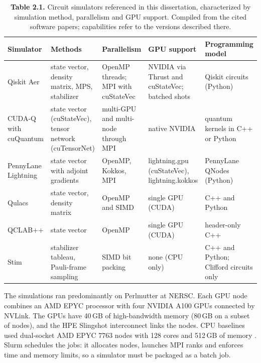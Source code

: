 \documentclass{report}
\theoremstyle{plain}
\theoremstyle{definition}
\theoremstyle{remark}
\begin{document}
\begin{table}[htbp]
\caption{\textbf{Table 2.1.} Circuit simulators referenced in this dissertation, characterized by simulation method, parallelism and GPU support. Compiled from the cited software papers; capabilities refer to the versions described there.}
\label{tab:bg:simulators}
 \footnotesize
\begin{tabular}{lllll}
\toprule
Simulator & Methods & Parallelism & GPU support & Programming model \\
\midrule
Qiskit Aer \cite{javadiabhari2024qiskit,doi2023multishotgpu} & state vector, density matrix, MPS, stabilizer & OpenMP threads; MPI with cuStateVec & NVIDIA via Thrust and cuStateVec; batched shots & Qiskit circuits (Python) \\

CUDA-Q with cuQuantum \cite{kim2023cudaquantum,bayraktar2023cuquantum} & state vector (cuStateVec), tensor network (cuTensorNet) & multi-GPU and multi-node through MPI & native NVIDIA & quantum kernels in C++ or Python \\

PennyLane Lightning \cite{asadi2024pennylanelightning} & state vector with adjoint gradients & OpenMP, Kokkos, MPI & lightning.gpu (cuStateVec), lightning.kokkos & PennyLane QNodes (Python) \\

Qulacs \cite{suzuki2021qulacs} & state vector, density matrix & OpenMP and SIMD & single GPU (CUDA) & C++ and Python \\

QCLAB++ \cite{vanbeeumen2023qclabpp} & state vector & OpenMP & single GPU (CUDA) & header-only C++ \\

Stim \cite{gidney2021stim} & stabilizer tableau, Pauli-frame sampling & SIMD bit packing & none (CPU only) & C++ and Python; Clifford circuits only \\
\bottomrule
\end{tabular}
\end{table}

The simulations ran predominantly on Perlmutter at NERSC. Each GPU node combines an AMD EPYC processor with four NVIDIA A100 GPUs connected by NVLink. The GPUs have 40 GB of high-bandwidth memory (80 GB on a subset of nodes), and the HPE Slingshot interconnect links the nodes. CPU baselines used dual-socket AMD EPYC 7763 nodes with 128 cores and 512 GB of memory \cite{guo2025qgear,choquette2021a100}. Slurm \cite{jette2023slurm} schedules the jobs: it allocates nodes, launches MPI ranks and enforces time and memory limits, so a simulator must be packaged as a batch job.
\end{document}
